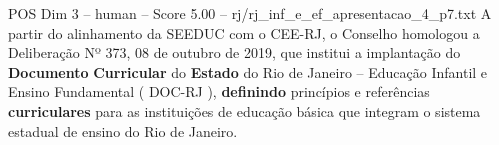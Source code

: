 \begin{textsample}{POS Dim 3 – human – Score 5.00 – rj/rj\_inf\_e\_ef\_apresentacao\_4\_p7.txt}  \label{ex:f3_pos_015}
A partir do alinhamento da SEEDUC com o CEE-RJ, o Conselho homologou a Deliberação Nº 373, 08 de outubro de 2019, que institui a implantação do \textbf{Documento} \textbf{Curricular} do \textbf{Estado} do Rio de Janeiro – Educação Infantil e Ensino Fundamental ( DOC-RJ ), \textbf{definindo} princípios e referências \textbf{curriculares} para as instituições de educação básica que integram o sistema estadual de ensino do Rio de Janeiro.

\end{textsample}
